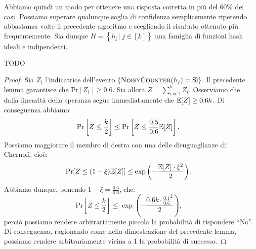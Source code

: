 Abbiamo quindi un modo per ottenere una risposta corretta in pi\`u del \(60\%\)
dei casi. Possiamo superare qualunque soglia di confidenza semplicemente
ripetendo abbastanza volte il precedente algoritmo e scegliendo il risultato
ottenuto pi\`u frequentemente. Sia dunque \(H = \left\{h_j\,|\,j\in[k]\right\}\) 
una famiglia di funzioni hash ideali e indipendenti.
\begin{algorithm}
  \caption{}
  \begin{algorithmic}[1]
      \EndIf
    \EndFor
      \State {}
    \EndIf
    \State {}
  \end{algorithmic}
\end{algorithm}

\begin{lemma}
  TODO
\end{lemma}
\begin{proof}
  Sia \(Z_i\) l'indicatrice dell'evento \(\{\textsc{NoisyCounter}(h_j)=\mbox{S\`i}\}\).
  Il precedente lemma garantisce che \(\mbox{Pr}[Z_i]\ge 0.6\). Sia allora \(Z=
  \sum_{i=1}^k{Z_i}\). Osserviamo che dalla linearit\`a della speranza segue 
  immediatamente che \(\mathbb{E}[Z]\ge 0.6k\). Di conseguenza abbiamo:
  \[\mbox{Pr}\left[Z\le\frac{k}{2}\right]\le\mbox{Pr}\left[Z\le\frac{0.5}{0.6}
  \mathbb{E}[Z]\right]\mbox{.}\]
  Possiamo maggiorare il membro di destra con una delle disuguaglianze di
  Chernoff, cio\`e:
  \[\mbox{Pr}[Z\le(1-\xi)\mathbb{E}[Z]]\le\exp{\left(-\frac{\mathbb{E}[Z]\cdot\xi^2}{2}\right)}\mbox{.}\]
  Abbiamo dunque, ponendo \(1-\xi = \frac{0.5}{0.6}\), che:
  \[\mbox{Pr}\left[Z\le\frac{k}{2}\right]\le\exp{\left(-\frac{0.6 k\cdot{\frac{0.1}{0.6}}^2}{2}\right)}\mbox{,}\]
  perci\`o possiamo rendere arbitrariamente  piccola la probabilit\`a di rispondere
  ``No''. Di conseguenza, ragionando come nella dimostrazione del precedente lemma,
  possiamo rendere arbitrariamente vicina a \(1\) la probabilit\`a di successo.
\end{proof}

